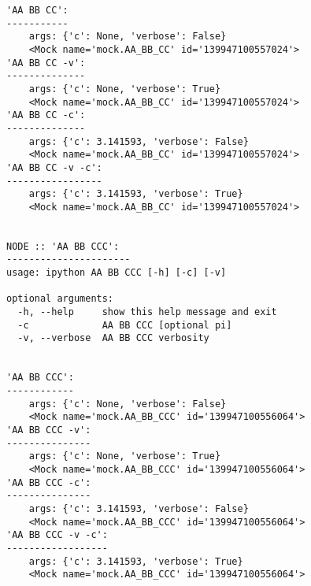 \documentclass[10pt]{amsart}
\numberwithin{equation}{section}
\begin{document}
\begin{verbatim}
'AA BB CC':
-----------
	args: {'c': None, 'verbose': False}
	<Mock name='mock.AA_BB_CC' id='139947100557024'>
'AA BB CC -v':
--------------
	args: {'c': None, 'verbose': True}
	<Mock name='mock.AA_BB_CC' id='139947100557024'>
'AA BB CC -c':
--------------
	args: {'c': 3.141593, 'verbose': False}
	<Mock name='mock.AA_BB_CC' id='139947100557024'>
'AA BB CC -v -c':
-----------------
	args: {'c': 3.141593, 'verbose': True}
	<Mock name='mock.AA_BB_CC' id='139947100557024'>


NODE :: 'AA BB CCC':
----------------------
usage: ipython AA BB CCC [-h] [-c] [-v]

optional arguments:
  -h, --help     show this help message and exit
  -c             AA BB CCC [optional pi]
  -v, --verbose  AA BB CCC verbosity


'AA BB CCC':
------------
	args: {'c': None, 'verbose': False}
	<Mock name='mock.AA_BB_CCC' id='139947100556064'>
'AA BB CCC -v':
---------------
	args: {'c': None, 'verbose': True}
	<Mock name='mock.AA_BB_CCC' id='139947100556064'>
'AA BB CCC -c':
---------------
	args: {'c': 3.141593, 'verbose': False}
	<Mock name='mock.AA_BB_CCC' id='139947100556064'>
'AA BB CCC -v -c':
------------------
	args: {'c': 3.141593, 'verbose': True}
	<Mock name='mock.AA_BB_CCC' id='139947100556064'>


\end{verbatim}
\end{document}
